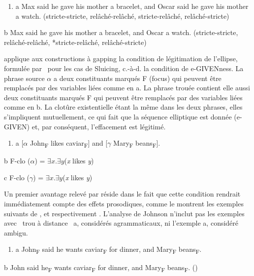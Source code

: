 \begin{enumerate}
\item \label{bkm:Ref288559762}a   Max said he gave his mother a bracelet, and Oscar said he gave his mother a watch. (stricte-stricte, relâché-relâché, stricte-relâché, relâché-stricte)


\end{enumerate}
  b  Max said he gave his mother a bracelet, and Oscar a watch. (stricte-stricte, relâché-relâché, *stricte-relâché, relâché-stricte)

\citet{Coppock2001} applique aux constructions à gapping la condition de légitimation de l'ellipse, formulée par \citet{Merchant2001}~pour les cas de Sluicing, c.-à-d. la condition de e-GIVENness. La phrase source $\alpha $ a deux constituants marqués F (focus) qui peuvent être remplacés par des variables liées comme en a. La phrase trouée contient elle aussi deux constituants marqués F qui peuvent être remplacés par des variables liées comme en b. La clotûre existentielle étant la même dans les deux phrases, elles s'impliquent mutuellement, ce qui fait que la séquence elliptique est donnée (e-GIVEN) et, par conséquent, l'effacement est légitimé. 


\begin{enumerate}
\item \label{bkm:Ref288560299}a   [$\alpha $ John\textsubscript{F} likes caviar\textsubscript{F}] and [$\gamma $ Mary\textsubscript{F} beans\textsubscript{F}].  


\end{enumerate}
  b  F-clo ($\alpha $) =  ${\exists x\text{.}\exists y}$(\textit{x} likes \textit{y})

  c  F-clo ($\gamma $) =  ${\exists x\text{.}\exists y}$(\textit{x} likes \textit{y})

Un premier avantage relevé par \citet{Coppock2001} réside dans le fait que cette condition rendrait immédiatement compte des effets prosodiques, comme le montrent les exemples suivants de \citet{Sag1980}, et respectivement \citet{Hankamer1973}. L'analyse de Johnson n'inclut pas les exemples avec {\guillemotleft}~trou à distance~{\guillemotright} a, considérés agrammaticaux, ni l'exemple a, considéré ambigu.


\begin{enumerate}
\item \label{bkm:Ref288561510}a   John\textsubscript{F} said he wants caviar\textsubscript{F} for dinner, and Mary\textsubscript{F} beans\textsubscript{F}.  


\end{enumerate}
  b  John said he\textsubscript{F} wants caviar\textsubscript{F} for dinner, and Mary\textsubscript{F} beans\textsubscript{F}.      (\citet{Sag1980})


